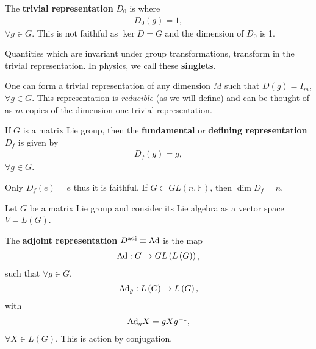 \begin{definition}
    The \textbf{trivial representation} $D_0$ is where 
    \begin{align}
        D_0 \left( g \right) = 1
    ,\end{align}
    $\forall g \in G$. This is not faithful as $\ker D = G$ and the dimension of $D_0$ is 1.
\end{definition}

Quantities which are invariant under group transformations, transform in the trivial representation. In physics, we call these \textbf{singlets}.

\begin{note}
    One can form a trivial representation of any dimension $M$ such that $D \left( g \right) = I_m$, $\forall g \in G$. This representation is \textit{reducible} (as we will define) and can be thought of as $m$ copies of the dimension one trivial representation.
\end{note}

\begin{definition}
    If $G$ is a matrix Lie group, then the \textbf{fundamental} or \textbf{defining representation} $D_f$ is given by
    \begin{align}
        D_f \left( g \right) = g
    ,\end{align}
    $\forall g \in G$.
\end{definition}

Only $D_f \left( e \right) = e$ thus it is faithful. If $G \subset GL \left( n, \mathbb{F} \right) $, then $\dim D_f = n$.

Let $G$ be a matrix Lie group and consider its Lie algebra as a vector space $V = L \left( G \right) $.

\begin{definition}
    The \textbf{adjoint representation} $D^{\text{adj}} \equiv \text{Ad}$ is the map
    \begin{align}
        \text{Ad} : G \to GL \left( L \left( G \right)  \right) 
    ,\end{align}
    such that $\forall g \in G$,
    \begin{align}
        \text{Ad}_g : L\left( G \right) \to L \left( G \right) 
    ,\end{align}
    with
    \begin{align}
        \text{Ad}_g X = g X g^{-1}
    ,\end{align}
    $\forall X \in L \left( G \right) $. This is action by conjugation.
\end{definition}

